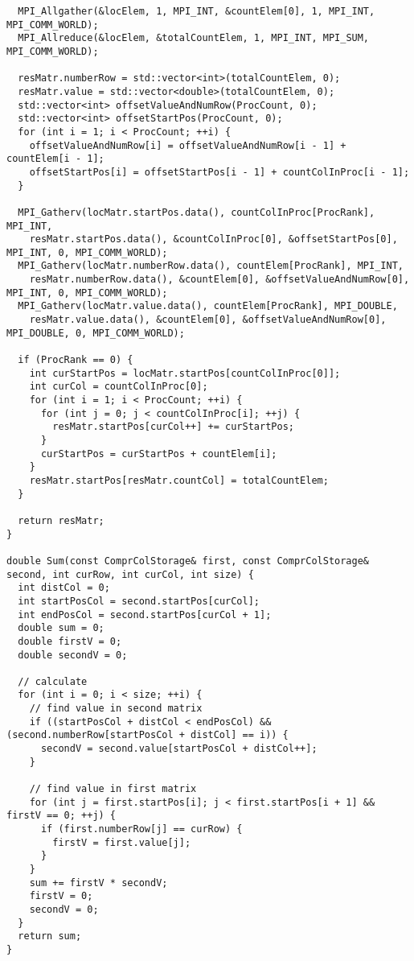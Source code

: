 \documentclass{report}
\begin{document}
\begin{lstlisting}
  MPI_Allgather(&locElem, 1, MPI_INT, &countElem[0], 1, MPI_INT, MPI_COMM_WORLD);
  MPI_Allreduce(&locElem, &totalCountElem, 1, MPI_INT, MPI_SUM, MPI_COMM_WORLD);

  resMatr.numberRow = std::vector<int>(totalCountElem, 0);
  resMatr.value = std::vector<double>(totalCountElem, 0);
  std::vector<int> offsetValueAndNumRow(ProcCount, 0);
  std::vector<int> offsetStartPos(ProcCount, 0);
  for (int i = 1; i < ProcCount; ++i) {
    offsetValueAndNumRow[i] = offsetValueAndNumRow[i - 1] + countElem[i - 1];
    offsetStartPos[i] = offsetStartPos[i - 1] + countColInProc[i - 1];
  }

  MPI_Gatherv(locMatr.startPos.data(), countColInProc[ProcRank], MPI_INT,
    resMatr.startPos.data(), &countColInProc[0], &offsetStartPos[0], MPI_INT, 0, MPI_COMM_WORLD);
  MPI_Gatherv(locMatr.numberRow.data(), countElem[ProcRank], MPI_INT,
    resMatr.numberRow.data(), &countElem[0], &offsetValueAndNumRow[0], MPI_INT, 0, MPI_COMM_WORLD);
  MPI_Gatherv(locMatr.value.data(), countElem[ProcRank], MPI_DOUBLE,
    resMatr.value.data(), &countElem[0], &offsetValueAndNumRow[0], MPI_DOUBLE, 0, MPI_COMM_WORLD);

  if (ProcRank == 0) {
    int curStartPos = locMatr.startPos[countColInProc[0]];
    int curCol = countColInProc[0];
    for (int i = 1; i < ProcCount; ++i) {
      for (int j = 0; j < countColInProc[i]; ++j) {
        resMatr.startPos[curCol++] += curStartPos;
      }
      curStartPos = curStartPos + countElem[i];
    }
    resMatr.startPos[resMatr.countCol] = totalCountElem;
  }

  return resMatr;
}

double Sum(const ComprColStorage& first, const ComprColStorage& second, int curRow, int curCol, int size) {
  int distCol = 0;
  int startPosCol = second.startPos[curCol];
  int endPosCol = second.startPos[curCol + 1];
  double sum = 0;
  double firstV = 0;
  double secondV = 0;

  // calculate
  for (int i = 0; i < size; ++i) {
    // find value in second matrix
    if ((startPosCol + distCol < endPosCol) && (second.numberRow[startPosCol + distCol] == i)) {
      secondV = second.value[startPosCol + distCol++];
    }

    // find value in first matrix
    for (int j = first.startPos[i]; j < first.startPos[i + 1] && firstV == 0; ++j) {
      if (first.numberRow[j] == curRow) {
        firstV = first.value[j];
      }
    }
    sum += firstV * secondV;
    firstV = 0;
    secondV = 0;
  }
  return sum;
}


\end{lstlisting}
\end{document}
